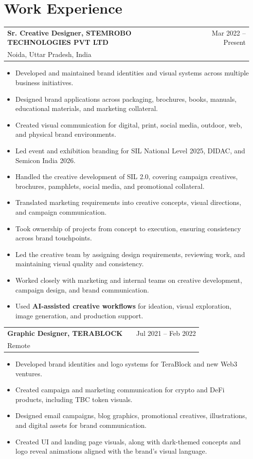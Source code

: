 \documentclass[a4paper,9pt]{article}
\makeatletter
\newenvironment{joblong}[3]
    {
    \begin{tabularx}{\linewidth}{@{}l X r@{}}
    \textbf{#1} & \hfill & {\color{textgray} #3} \\
    {\small\color{textgray} #2} & & \\[3.75pt]
    \end{tabularx}
    \begin{minipage}[t]{\linewidth}
    \begin{itemize}[nosep,after=\strut, leftmargin=1em, itemsep=3pt]
    }
    {
    \end{itemize}
    \end{minipage}
    }
\makeatother
\begin{document}
\section{Work Experience}

\begin{joblong}{Sr. Creative Designer, STEMROBO TECHNOLOGIES PVT LTD}{Noida, Uttar Pradesh, India}{Mar 2022 – Present}
    \item Developed and maintained brand identities and visual systems across multiple business initiatives.
    \item Designed brand applications across packaging, brochures, books, manuals, educational materials, and marketing collateral.
    \item Created visual communication for digital, print, social media, outdoor, web, and physical brand environments.
    \item Led event and exhibition branding for SIL National Level 2025, DIDAC, and Semicon India 2026.
    \item Handled the creative development of SIL 2.0, covering campaign creatives, brochures, pamphlets, social media, and promotional collateral.
    \item Translated marketing requirements into creative concepts, visual directions, and campaign communication.
    \item Took ownership of projects from concept to execution, ensuring consistency across brand touchpoints.
    \item Led the creative team by assigning design requirements, reviewing work, and maintaining visual quality and consistency.
    \item Worked closely with marketing and internal teams on creative development, campaign design, and brand communication.
    \item Used \textbf{AI-assisted creative workflows} for ideation, visual exploration, image generation, and production support.
\end{joblong}

\begin{joblong}{Graphic Designer, TERABLOCK}{Remote}{Jul 2021 – Feb 2022}
    \item Developed brand identities and logo systems for TeraBlock and new Web3 ventures.
    \item Created campaign and marketing communication for crypto and DeFi products, including TBC token visuals.
    \item Designed email campaigns, blog graphics, promotional creatives, illustrations, and digital assets for brand communication.
    \item Created UI and landing page visuals, along with dark-themed concepts and logo reveal animations aligned with the brand's visual language.
\end{joblong}
\end{document}
